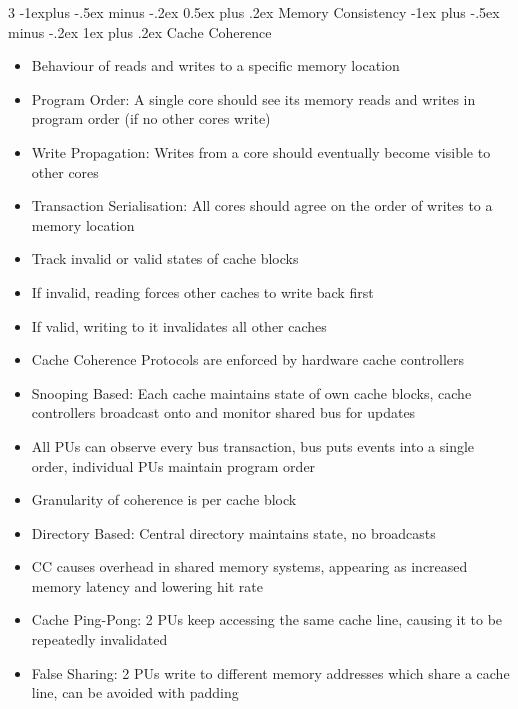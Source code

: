 \documentclass[10pt, landscape]{article}
\makeatletter
\renewcommand{\section}{\@startsection{section}{1}{0mm}%
                                {-1ex plus -.5ex minus -.2ex}%
                                {0.5ex plus .2ex}%
                                {\normalfont\large\bfseries}}
\renewcommand{\section}{\@startsection{section}{2}{0mm}%
                                {-1explus -.5ex minus -.2ex}%
                                {0.5ex plus .2ex}%
                                {\normalfont\normalsize\bfseries}}
\renewcommand{\subsection}{\@startsection{subsection}{3}{0mm}%
                                {-1ex plus -.5ex minus -.2ex}%
                                {1ex plus .2ex}%
                                {\normalfont\small\bfseries}}%
\makeatother
\begin{document}
\begin{multicols*}{3}
\section{Memory Consistency}
\subsection{Cache Coherence}
\begin{itemize}
    \item Behaviour of reads and writes to a specific memory location
    \item Program Order: A single core should see its memory reads and writes in program order (if no other cores write)
    \item Write Propagation: Writes from a core should eventually become visible to other cores
    \item Transaction Serialisation: All cores should agree on the order of writes to a memory location
    \item Track invalid or valid states of cache blocks
    \item If invalid, reading forces other caches to write back first
    \item If valid, writing to it invalidates all other caches
    \item Cache Coherence Protocols are enforced by hardware cache controllers
    \item Snooping Based: Each cache maintains state of own cache blocks, cache controllers broadcast onto and monitor shared bus for updates
    \item All PUs can observe every bus transaction, bus puts events into a single order, individual PUs maintain program order
    \item Granularity of coherence is per cache block
    \item Directory Based: Central directory maintains state, no broadcasts
    \item CC causes overhead in shared memory systems, appearing as increased memory latency and lowering hit rate
    \item Cache Ping-Pong: 2 PUs keep accessing the same cache line, causing it to be repeatedly invalidated
    \item False Sharing: 2 PUs write to different memory addresses which share a cache line, can be avoided with padding
\end{itemize}


\end{multicols*}
\end{document}
